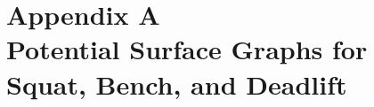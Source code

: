 \appendix

\section{
    Appendix A
    \\
    \large{Potential Surface Graphs for Squat, Bench, and Deadlift}
}
\label{sec:AppendixA}

%         
%        
%
%         
%        
%
